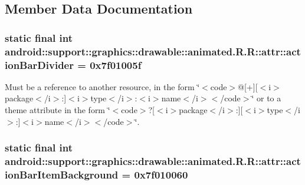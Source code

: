\subsection{Member Data Documentation}
\hypertarget{classandroid_1_1support_1_1graphics_1_1drawable_1_1animated_1_1_r_1_1attr_a155d0d3c41de7e3a6f0e0e79d5d5b24}{
\subsubsection[{actionBarDivider}]{\setlength{\rightskip}{0pt plus 5cm}static final int android::support::graphics::drawable::animated.R.R::attr::actionBarDivider = 0x7f01005f}}
\label{classandroid_1_1support_1_1graphics_1_1drawable_1_1animated_1_1_r_1_1attr_a155d0d3c41de7e3a6f0e0e79d5d5b24}


Must be a reference to another resource, in the form \char`\"{}$<$code$>$@\mbox{[}+\mbox{]}\mbox{[}$<$i$>$package$<$/i$>$:\mbox{]}$<$i$>$type$<$/i$>$:$<$i$>$name$<$/i$>$$<$/code$>$\char`\"{} or to a theme attribute in the form \char`\"{}$<$code$>$?\mbox{[}$<$i$>$package$<$/i$>$:\mbox{]}\mbox{[}$<$i$>$type$<$/i$>$:\mbox{]}$<$i$>$name$<$/i$>$$<$/code$>$\char`\"{}. \hypertarget{classandroid_1_1support_1_1graphics_1_1drawable_1_1animated_1_1_r_1_1attr_e58f29e7f7325f549b089fb375b9998d}{
\subsubsection[{actionBarItemBackground}]{\setlength{\rightskip}{0pt plus 5cm}static final int android::support::graphics::drawable::animated.R.R::attr::actionBarItemBackground = 0x7f010060}}
\label{classandroid_1_1support_1_1graphics_1_1drawable_1_1animated_1_1_r_1_1attr_e58f29e7f7325f549b089fb375b9998d}


